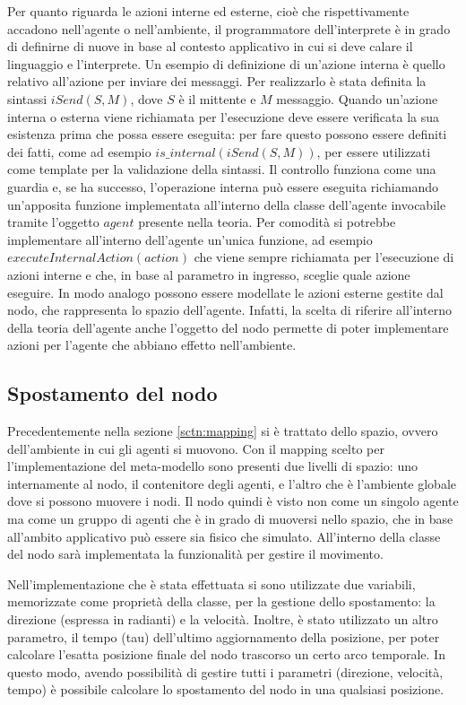 Per quanto riguarda le azioni interne ed esterne, cioè che rispettivamente accadono nell'agente o nell'ambiente, il programmatore dell'interprete è in grado di definirne di nuove in base al contesto applicativo in cui si deve calare il linguaggio e l'interprete. Un esempio di definizione di un'azione interna è quello relativo all'azione per inviare dei messaggi. Per realizzarlo è stata definita la sintassi $iSend(S,M)$, dove $S$ è il mittente e $M$ messaggio. Quando un'azione interna o esterna viene richiamata per l'esecuzione deve essere verificata la sua esistenza prima che possa essere eseguita: per fare questo possono essere definiti dei fatti, come ad esempio $is\_internal(iSend(S,M))$, per essere utilizzati come template per la validazione della sintassi. Il controllo funziona come una guardia e, se ha successo, l'operazione interna può essere eseguita richiamando un'apposita funzione implementata all'interno della classe dell'agente invocabile tramite l'oggetto $agent$ presente nella teoria. Per comodità si potrebbe implementare all'interno dell'agente un'unica funzione, ad esempio $executeInternalAction(action)$ che viene sempre richiamata per l'esecuzione di azioni interne e che, in base al parametro in ingresso, sceglie quale azione eseguire.
In modo analogo possono essere modellate le azioni esterne gestite dal nodo, che rappresenta lo spazio dell'agente. Infatti, la scelta di riferire all'interno della teoria dell'agente anche l'oggetto del nodo permette di poter implementare azioni per l'agente che abbiano effetto nell'ambiente.

\subsection{Spostamento del nodo}\label{sctn:SpostamentoNodo}
Precedentemente nella sezione \ref{sctn:mapping} si è trattato dello spazio, ovvero dell'ambiente in cui gli agenti si muovono. Con il mapping scelto per l'implementazione del meta-modello sono presenti due livelli di spazio: uno internamente al nodo, il contenitore degli agenti, e l'altro che è l'ambiente globale dove si possono muovere i nodi.
Il nodo quindi è visto non come un singolo agente ma come un gruppo di agenti che è in grado di muoversi nello spazio, che in base all'ambito applicativo può essere sia fisico che simulato. All'interno della classe del nodo sarà implementata la funzionalità per gestire il movimento.

Nell'implementazione che è stata effettuata si sono utilizzate due variabili, memorizzate come proprietà della classe, per la gestione dello spostamento: la direzione (espressa in radianti) e la velocità. Inoltre, è stato utilizzato un altro parametro, il tempo (tau) dell'ultimo aggiornamento della posizione, per poter calcolare l'esatta posizione finale del nodo trascorso un certo arco temporale. In questo modo, avendo possibilità di gestire tutti i parametri (direzione, velocità, tempo) è possibile calcolare lo spostamento del nodo in una qualsiasi posizione.

